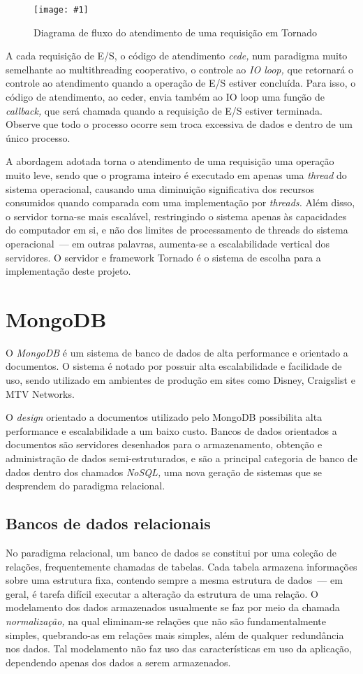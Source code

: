 \documentclass[ruledheader, 12pt]{abnt}
\newcommand{\figcustom}[4]{\par
	\begin{figure}[#3]
		\centering
		\texttt{[image: \#1]}
		\caption{\label{fig:#1}#2}
	\end{figure}
\par}
\newcommand{\fig}[2]{\figcustom{#1}{#2}{bp}{1}}
\begin{document}
\fig{tornado-ioloop}{Diagrama de fluxo do atendimento de uma requisição em Tornado}

A cada requisição de E/S, o código de atendimento \emph{cede,} num paradigma muito semelhante ao multithreading cooperativo, o controle ao \emph{IO loop,} que retornará o controle ao atendimento quando a operação de E/S estiver concluída. Para isso, o código de atendimento, ao ceder, envia também ao IO loop uma função de \emph{callback,} que será chamada quando a requisição de E/S estiver terminada. Observe que todo o processo ocorre sem troca excessiva de dados e dentro de um único processo.

A abordagem adotada torna o atendimento de uma requisição uma operação muito leve, sendo que o programa inteiro é executado em apenas uma \emph{thread} do sistema operacional, causando uma diminuição significativa dos recursos consumidos quando comparada com uma implementação por \emph{threads.} Além disso, o servidor torna-se mais escalável, restringindo o sistema apenas às capacidades do computador em si, e não dos limites de processamento de threads do sistema operacional~--- em outras palavras, aumenta-se a escalabilidade vertical dos servidores. O servidor e framework Tornado é o sistema de escolha para a implementação deste projeto.

\section{MongoDB}

O \emph{MongoDB} é um sistema de banco de dados de alta performance e orientado a documentos. O sistema é notado por possuir alta escalabilidade e facilidade de uso, sendo utilizado em ambientes de produção em sites como Disney, Craigslist e MTV Networks.

O \emph{design} orientado a documentos utilizado pelo MongoDB possibilita alta performance e escalabilidade a um baixo custo. Bancos de dados orientados a documentos são servidores desenhados para o armazenamento, obtenção e administração de dados semi-estruturados, e são a principal categoria de banco de dados dentro dos chamados \emph{NoSQL,} uma nova geração de sistemas que se desprendem do paradigma relacional.

\subsection{Bancos de dados relacionais}

No paradigma relacional, um banco de dados se constitui por uma coleção de relações, frequentemente chamadas de tabelas. Cada tabela armazena informações sobre uma estrutura fixa, contendo sempre a mesma estrutura de dados~--- em geral, é tarefa difícil executar a alteração da estrutura de uma relação. O modelamento dos dados armazenados usualmente se faz por meio da chamada \emph{normalização,} na qual eliminam-se relações que não são fundamentalmente simples, quebrando-as em relações mais simples, além de qualquer redundância nos dados. Tal modelamento não faz uso das características em uso da aplicação, dependendo apenas dos dados a serem armazenados.
\end{document}
